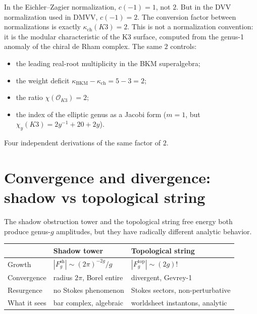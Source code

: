 \documentclass[11pt]{article}
\newcommand{\cO}{\mathcal{O}}
\begin{document}
\begin{observation}
In the Eichler--Zagier normalization, $c(-1) = 1$, not $2$. But in the DVV normalization used in DMVV, $c(-1) = 2$. The conversion factor between normalizations is exactly $\kappa_{\mathrm{ch}}(K3) = 2$. This is not a normalization convention: it is the modular characteristic of the K3 surface, computed from the genus-1 anomaly of the chiral de Rham complex. The same $2$ controls:
\begin{itemize}
\item the leading real-root multiplicity in the BKM superalgebra;
\item the weight deficit $\kappa_{\mathrm{BKM}} - \kappa_{\mathrm{ch}} = 5 - 3 = 2$;
\item the ratio $\chi(\cO_{K3}) = 2$;
\item the index of the elliptic genus as a Jacobi form ($m = 1$, but $\chi_y(K3) = 2y^{-1} + 20 + 2y$).
\end{itemize}
Four independent derivations of the same factor of $2$.
\end{observation}


\section{Convergence and divergence: shadow vs topological string}
\label{sec:motivic-convergence-divergence}

The shadow obstruction tower and the topological string free energy both produce genus-$g$ amplitudes, but they have radically different analytic behavior.

\begin{center}
\renewcommand{\arraystretch}{1.2}
\begin{tabular}{lll}
 \toprule
 & \textbf{Shadow tower} & \textbf{Topological string} \\
 \midrule
 Growth & $|F_g^{\mathrm{sh}}| \sim (2\pi)^{-2g} / g$ & $|F_g^{\mathrm{top}}| \sim (2g)!$ \\
 Convergence & radius $2\pi$, Borel entire & divergent, Gevrey-1 \\
 Resurgence & no Stokes phenomenon & Stokes sectors, non-perturbative \\
 What it sees & bar complex, algebraic & worldsheet instantons, analytic \\
 \bottomrule
\end{tabular}
\end{center}
\end{document}
